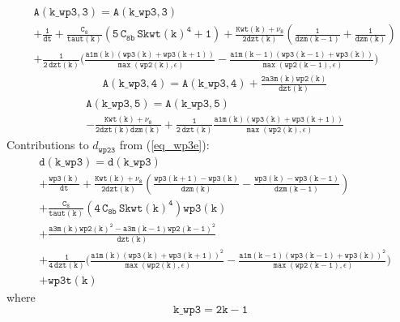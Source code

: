 \documentclass[11pt,fleqn]{article}
\begin{document}
%
\begin{equation}
\begin{split}
& \mathtt{ A(k\_wp3,3) = A(k\_wp3,3) }\\
& \mathtt{
+ \frac{1}{dt}
+ \frac{C_8}{taut(k)}
   \left(  5 \, C_{8b} \, {Skwt(k)}^4 + 1 \right)
+ \frac{Kwt(k) + \nu_8}{2dzt(k)}
  \left( \frac{1}{dzm(k-1)} + \frac{1}{dzm(k)}  \right)
} \\
& \mathtt{
+ \frac{1}{2 \, dzt(k)}
  \bigg(
    \frac{ a1m(k)
           \left(wp3(k)+wp3(k+1)\right) }
         { \max\left( wp2(k), \epsilon \right) }
  - \frac{ a1m(k-1)
           \left(wp3(k-1)+wp3(k)\right) }
         { \max\left( wp2(k-1), \epsilon \right) }
  \bigg)
}
\end{split}
\end{equation}
%
\begin{equation}
\begin{split}
& \mathtt{ A(k\_wp3,4) = A(k\_wp3,4)
  + \frac{2 a3m(k) wp2(k)}{dzt(k)}
  }
\end{split}
\end{equation}
%
\begin{equation}
\begin{split}
& \mathtt{ A(k\_wp3,5) = A(k\_wp3,5) }\\
& \mathtt{
- \frac{Kwt(k) + \nu_8}{2dzt(k)dzm(k)} 
+ \frac{1}{2 \, dzt(k)}
  \frac{ a1m(k) \left(wp3(k)+wp3(k+1)\right) }
       { \max\left( wp2(k), \epsilon \right) }
}
\end{split}
\end{equation}
%
Contributions to $d_{\mathtt{wp23}}$ from (\ref{eq_wp3e}):
%
\begin{equation}
\begin{split}
& \mathtt{ d(k\_wp3) = d(k\_wp3) } \\
& \mathtt{
  + \frac{wp3(k)}{dt} 
  + \frac{Kwt(k) + \nu_8}{2dzt(k)} 
    \left( 
        \frac{wp3(k+1)-wp3(k)}{dzm(k)}
      - \frac{wp3(k)-wp3(k-1)}{dzm(k-1)}
    \right)
  } \\
& \mathtt{
+ \frac{C_8}{taut(k)}
   \left( 4 \, C_{8b} \, {Skwt(k)}^4 \right) wp3(k)
  } \\
& \mathtt{
  + \frac{a3m(k) wp2(k)^2 - a3m(k-1) wp2(k-1)^2 }
         {dzt(k)}
  } \\
& \mathtt{
  + \frac{1}{4 \, dzt(k)}
    \bigg(
      \frac{ a1m(k)
             \left(wp3(k)+wp3(k+1)\right)^2 }
           { \max\left( wp2(k), \epsilon \right) }
     -\frac{ a1m(k-1)
             \left(wp3(k-1)+wp3(k)\right)^2 }
           { \max\left( wp2(k-1), \epsilon \right) }
    \bigg)
  } \\
& \mathtt{
+ wp3t(k)
  }
\end{split}
\end{equation}
%
where
%
\begin{equation}
\mathtt{ k\_wp3 = 2 k - 1}
\end{equation}
%
\end{document}
